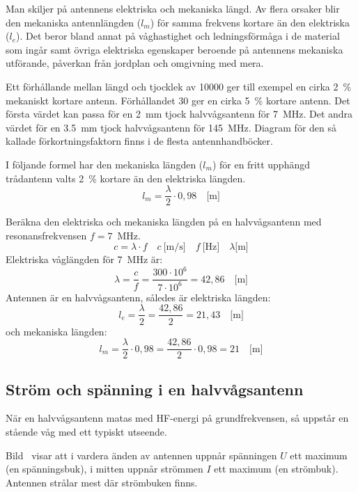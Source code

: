Man skiljer på antennens elektriska och mekaniska längd.
Av flera orsaker blir den mekaniska antennlängden (\(l_m\)) för samma
frekvens kortare än den elektriska (\(l_e\)).
Det beror bland annat på våghastighet och ledningsförmåga i de material som
ingår samt övriga elektriska egenskaper beroende på antennens mekaniska
utförande, påverkan från jordplan och omgivning med mera.

Ett förhållande mellan längd och tjocklek av 10000 ger till exempel en cirka 2~\%
mekaniskt kortare antenn.
Förhållandet 30 ger en cirka 5~\% kortare antenn.
Det första värdet kan passa för en \qty{2}{\milli\metre} tjock halvvågsantenn
för \qty{7}{\mega\hertz}.
Det andra värdet för en \qty{3,5}{\milli\metre} tjock halvvågsantenn för
\qty{145}{\mega\hertz}.
Diagram för den så kallade förkortningsfaktorn finns i de flesta
antennhandböcker.

I följande formel har den mekaniska längden (\(l_m\)) för en fritt upphängd
trådantenn valts 2~\% kortare än den elektriska längden.
\[l_m = \frac{\lambda}{2} \cdot 0,98 \quad \text{[m]}\]
\begin{exempelbox}
Beräkna den elektriska och mekaniska längden på en halvvågsantenn med
resonansfrekvensen \(f = 7\)~MHz.
\[
c = \lambda \cdot f
\quad c\ \text{[m/s]} \quad f\ \text{[Hz]} \quad \lambda \text{[m]}
\]
\tcblower
Elektriska våglängden för \qty{7}{\mega\hertz} är:
\[
\lambda = \frac{c}{f} = \frac{300 \cdot 10^6}{7 \cdot 10^6} = 42,86
\quad \text{[m]}
\]
Antennen är en halvvågsantenn, således är elektriska längden:
\[
l_e = \frac{\lambda}{2} = \frac{42,86}{2} = 21,43 \quad \text{[m]}
\]
och mekaniska längden:
\[
l_m = \frac{\lambda}{2} \cdot 0,98 = \frac{42,86}{2}\cdot 0,98 = 21
\quad \text{[m]}
\]
\end{exempelbox}

\subsection{Ström och spänning i en halvvågs\-antenn}


När en halvvågsantenn matas med HF-energi på grundfrekvensen, så uppstår en
stående våg med ett typiskt utseende.

Bild~ visar att i vardera änden av antennen uppnår spänningen
\(U\) ett maximum (en spänningsbuk), i mitten uppnår strömmen \(I\)
ett maximum (en strömbuk).
Antennen strålar mest där strömbuken finns.

